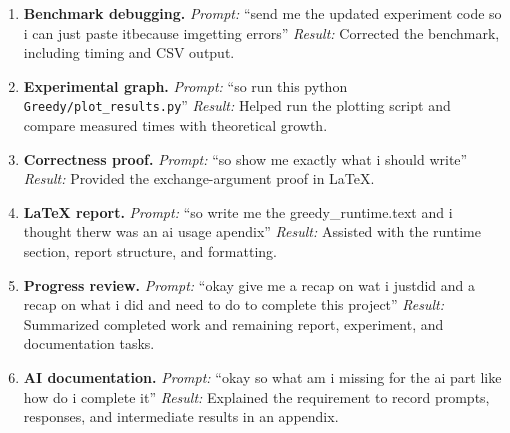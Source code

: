 \begin{enumerate}
\item \textbf{Benchmark debugging.}
\emph{Prompt:} ``send me the updated experiment code so
i can just paste itbecause imgetting errors''
\emph{Result:} Corrected the benchmark, including
timing and CSV output.

\item \textbf{Experimental graph.}
\emph{Prompt:} ``so run this python
\texttt{Greedy/plot\_results.py}''
\emph{Result:} Helped run the plotting script and
compare measured times with theoretical growth.

\item \textbf{Correctness proof.}
\emph{Prompt:} ``so show me exactly what i should
write''
\emph{Result:} Provided the exchange-argument proof in
LaTeX.

\item \textbf{LaTeX report.}
\emph{Prompt:} ``so write me the greedy\_runtime.text
and i thought therw was an ai usage apendix''
\emph{Result:} Assisted with the runtime section,
report structure, and formatting.

\item \textbf{Progress review.}
\emph{Prompt:} ``okay give me a recap on wat i justdid
and a recap on what i did and need to do to complete
this project''
\emph{Result:} Summarized completed work and remaining
report, experiment, and documentation tasks.

\item \textbf{AI documentation.}
\emph{Prompt:} ``okay so what am i missing for the ai
part like how do i complete it''
\emph{Result:} Explained the requirement to record
prompts, responses, and intermediate results in an
appendix.

\end{enumerate}
